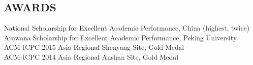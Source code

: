 \documentclass[margin]{res}
\newcommand{\Bullet}[1]{{\raisebox{0.25ex}{\tiny$\bullet$\ }}{#1}\\}
\begin{document}
\begin{resume}
\section{AWARDS}
    \Bullet{National Scholarship for Excellent Academic Performance, China (highest, twice)}
    \Bullet{Arawana Scholarship for Excellent Academic Performance, Peking University}
    \Bullet{ACM-ICPC 2015 Asia Regional Shenyang Site, Gold Medal}
    \Bullet{ACM-ICPC 2014 Asia Regional Anshan Site, Gold Medal}

%
%
%

%


\end{resume}
\end{document}
